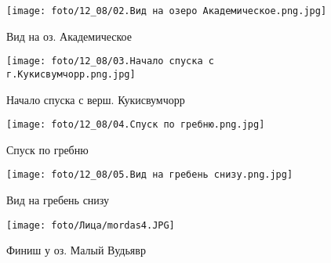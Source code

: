 \begin{figure}
    \centering
    \texttt{[image: foto/12\_08/02.Вид на озеро Академическое.png.jpg]}
    \caption{Вид на оз. Академическое}
\end{figure}

\begin{figure}
    \centering
    \texttt{[image: foto/12\_08/03.Начало спуска с г.Кукисвумчорр.png.jpg]}
    \caption{Начало спуска с верш. Кукисвумчорр}
\end{figure}

\begin{figure}
    \centering
    \texttt{[image: foto/12\_08/04.Спуск по гребню.png.jpg]}
    \caption{Спуск по гребню}
\end{figure}

\begin{figure}
    \centering
    \texttt{[image: foto/12\_08/05.Вид на гребень снизу.png.jpg]}
    \caption{Вид на гребень снизу}
\end{figure}

\begin{figure}
    \centering
    \texttt{[image: foto/Лица/mordas4.JPG]}
    \caption{Финиш у оз. Малый Вудьявр}
\end{figure}
